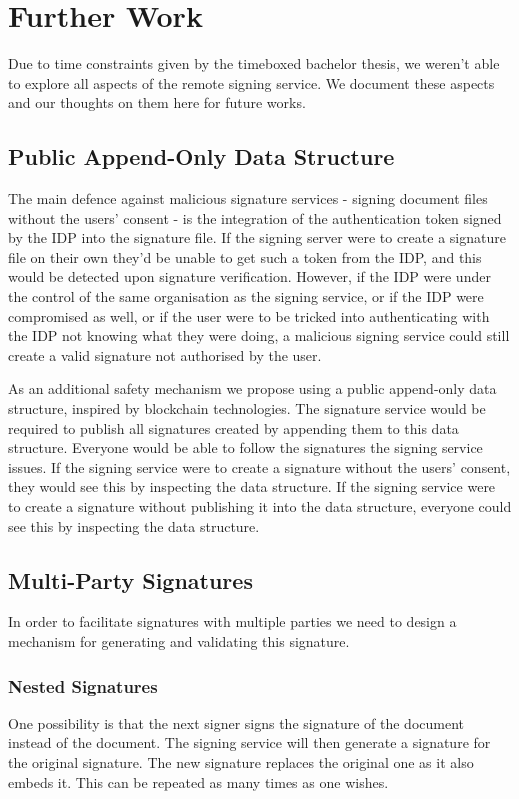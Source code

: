\chapter{Further Work}\label{ch:further-work}
Due to time constraints given by the timeboxed bachelor thesis, we weren't able to explore all aspects of the remote signing service.
We document these aspects and our thoughts on them here for future works.

\section{Public Append-Only Data Structure}\label{sec:public-append-only-data-structure}
The main defence against malicious signature services - signing document files without the users' consent - is the integration of the authentication token signed by the \gls{IDP} into the signature file.
If the signing server were to create a signature file on their own they'd be unable to get such a token from the \gls{IDP}, and this would be detected upon signature verification.
However, if the \gls{IDP} were under the control of the same organisation as the signing service,
or if the \gls{IDP} were compromised as well,
or if the user were to be tricked into authenticating with the \gls{IDP} not knowing what they were doing,
a malicious signing service could still create a valid signature not authorised by the user.

As an additional safety mechanism we propose using a public append-only data structure, inspired by blockchain technologies.
The signature service would be required to publish all signatures created by appending them to this data structure.
Everyone would be able to follow the signatures the signing service issues.
If the signing service were to create a signature without the users' consent, they would see this by inspecting the data structure.
If the signing service were to create a signature without publishing it into the data structure, everyone could see this by inspecting the data structure.

\section{Multi-Party Signatures}\label{sec:multi-party-signatures}
In order to facilitate signatures with multiple parties we need to design a mechanism for generating and validating this signature.

\subsection{Nested Signatures}
One possibility is that the next signer signs the signature of the document instead of the document.
The signing service will then generate a signature for the original signature.
The new signature replaces the original one as it also embeds it.
This can be repeated as many times as one wishes.

